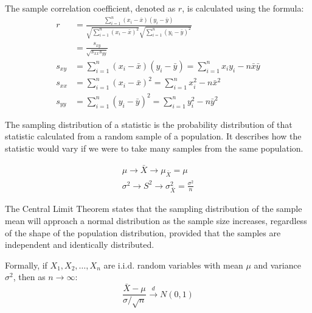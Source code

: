 \documentclass[answers,12pt,addpoints]{exam}
\begin{document}
\begin{remark}

    The sample correlation coefficient, denoted as $r$, is calculated using the formula:
    \begin{align*}
    r &= \frac{\sum_{i=1}^{n} (x_i - \bar{x})(y_i - \bar{y})}{\sqrt{\sum_{i=1}^{n} (x_i - \bar{x})^2} \sqrt{\sum_{i=1}^{n} (y_i - \bar{y})^2}} \\
    &= \frac{s_{xy}}{\sqrt{s_{xx} s_{yy}}} \\
    s_{xy} &= \sum_{i=1}^{n} (x_i - \bar{x})(y_i - \bar{y}) = \sum_{i=1}^{n} x_i y_i - n \bar{x} \bar{y} \\
    s_{xx} &= {\sum_{i=1}^{n} (x_i - \bar{x})^2} = \sum_{i=1}^{n} x_i^2 - n \bar{x}^2 \\ 
    s_{yy} &= {\sum_{i=1}^{n} (y_i - \bar{y})^2} = \sum_{i=1}^{n} y_i^2 - n \bar{y}^2
    \end{align*}
\end{remark}

\begin{definition}
    The sampling distribution of a statistic is the probability distribution of that statistic calculated from a random sample of a population. It describes how the statistic would vary if we were to take many samples from the same population.

    \begin{align*}
        \mu \to \bar{X} \to \mu_{\bar{X}} = \mu \\
        \sigma^2 \to S^2 \to \sigma^2_{\bar{X}} = \frac{\sigma^2}{n}
    \end{align*}
    
\end{definition}

\begin{definition}
    The Central Limit Theorem states that the sampling distribution of the sample mean will approach a normal distribution as the sample size increases, regardless of the shape of the population distribution, provided that the samples are independent and identically distributed.

    Formally, if $X_1, X_2, \ldots, X_n$ are i.i.d. random variables with mean $\mu$ and variance $\sigma^2$, then as $n \to \infty$:
    \[
    \frac{\bar{X} - \mu}{\sigma / \sqrt{n}} \xrightarrow{d} N(0, 1)
    \]
    
\end{definition}
\end{document}
